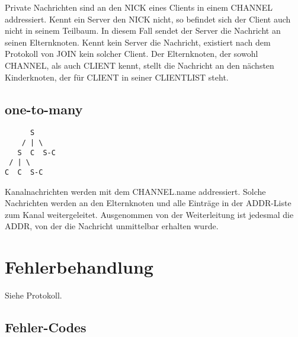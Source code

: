 \documentclass{article}
\begin{document}
Private Nachrichten sind an den NICK eines Clients in einem CHANNEL addressiert. Kennt ein Server den NICK nicht, so befindet sich der Client auch nicht in seinem Teilbaum. In diesem Fall sendet der Server die Nachricht an seinen Elternknoten. Kennt kein Server die Nachricht, existiert nach dem Protokoll von JOIN kein solcher Client. Der Elternknoten, der sowohl CHANNEL, als auch CLIENT kennt, stellt die Nachricht an den nächsten Kinderknoten, der für CLIENT in seiner CLIENTLIST steht.

\subsection{one-to-many}

\begin{lstlisting}
      S
    / | \
   S  C  S-C
 / | \
C  C  S-C
\end{lstlisting}

Kanalnachrichten werden mit dem CHANNEL.name addressiert. Solche Nachrichten werden an den Elternknoten und alle Einträge in der ADDR-Liste zum Kanal weitergeleitet. Ausgenommen von der Weiterleitung ist jedesmal die ADDR, von der die Nachricht unmittelbar erhalten wurde.


\section{Fehlerbehandlung}

Siehe Protokoll.

\subsection{Fehler-Codes}
\end{document}
